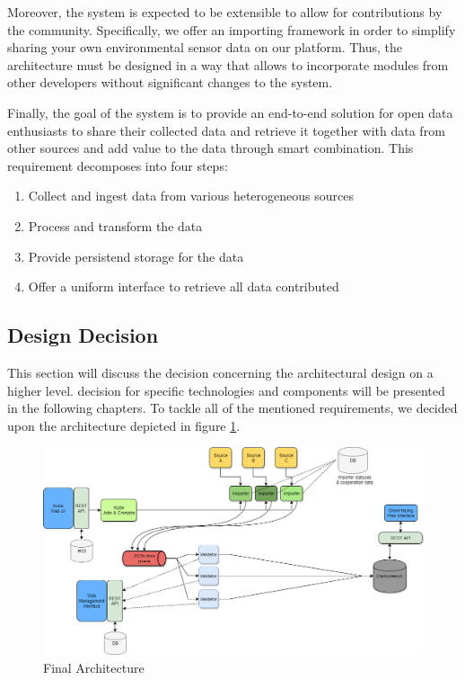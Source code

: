 Moreover, the system is expected to be extensible to allow for
contributions by the community. Specifically, we offer an importing
framework in order to simplify sharing your own environmental sensor
data on our platform. Thus, the architecture must be designed in a way
that allows to incorporate modules from other developers without
significant changes to the system.

Finally, the goal of the system is to provide an end-to-end solution for
open data enthusiasts to share their collected data and retrieve it
together with data from other sources and add value to the data through
smart combination. This requirement decomposes into four steps:

\begin{enumerate}
\def\labelenumi{\arabic{enumi}.}
\tightlist
\item
  Collect and ingest data from various heterogeneous sources
\item
  Process and transform the data
\item
  Provide persistend storage for the data
\item
  Offer a uniform interface to retrieve all data contributed
\end{enumerate}

\subsection{Design Decision}\label{design-decision}

This section will discuss the decision concerning the architectural
design on a higher level. decision for specific technologies and
components will be presented in the following chapters. To tackle all of
the mentioned requirements, we decided upon the architecture depicted in figure \ref{fig:architecture_4}.

\begin{figure}
	\centering
		\includegraphics[width=1.00\textwidth]{images/170713_architecture4.png}
	\caption{Final Architecture}
	\label{fig:architecture_4}
\end{figure}

